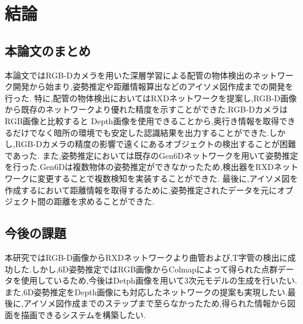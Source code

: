 ﻿\chapter{%
結論}

\section{本論文のまとめ}
本論文ではRGB-Dカメラを用いた深層学習による配管の物体検出のネットワーク開発から始まり,姿勢推定や距離情報算出などのアイソメ図作成までの開発を行った.
特に,配管の物体検出においてはRXDネットワークを提案し,RGB-D画像から既存のネットワークより優れた精度を示すことができた.RGB-DカメラはRGB画像と比較すると
Depth画像を使用できることから,奥行き情報を取得できるだけでなく暗所の環境でも安定した認識結果を出力することができた.しかし,RGB-Dカメラの精度の影響で遠くにあるオブジェクトの検出することが困難であった.
また,姿勢推定においては既存のGen6Dネットワークを用いて姿勢推定を行った.Gen6Dは複数物体の姿勢推定ができなかったため,検出器をRXDネットワークに変更することで複数検知を実装することができた.
最後に,アイソメ図を作成するにおいて距離情報を取得するために,姿勢推定されたデータを元にオブジェクト間の距離を求めることができた.

\section{今後の課題}
本研究ではRGB-D画像からRXDネットワークより曲管および,T字管の検出に成功した.しかし,6D姿勢推定ではRGB画像からColmapによって得られた点群データを使用しているため,今後はDetph画像を用いて3次元モデルの生成を行いたい.
また,6D姿勢推定をDepth画像にも対応したネットワークの提案も実現したい.最後に,アイソメ図作成までのステップまで至らなかったため,得られた情報から図面を描画できるシステムを構築したい.